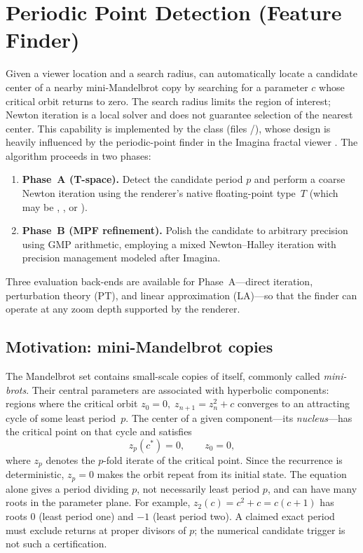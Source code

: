 \section{Periodic Point Detection (Feature Finder)}
\label{sec:feature-finder}

Given a viewer location and a search radius, \FractalShark{} can automatically
locate a candidate center of a nearby mini-Mandelbrot copy by searching for a
parameter $c$ whose critical orbit returns to zero.  The search radius limits
the region of interest; Newton iteration is a local solver and does not
guarantee selection of the nearest center.  This capability is
implemented by the  class (files
/), whose design is heavily
influenced by the periodic-point finder in the Imagina fractal viewer \cite{Imagina}.  The
algorithm proceeds in two phases:
\begin{enumerate}
\item \textbf{Phase~A (T-space).}
  Detect the candidate period $p$ and perform a coarse Newton iteration using
  the renderer's native floating-point type~$T$ (which may be ,
  , or ).
\item \textbf{Phase~B (MPF refinement).}
  Polish the candidate to arbitrary precision using GMP 
  arithmetic, employing a mixed Newton--Halley iteration with precision
  management modeled after Imagina.
\end{enumerate}
Three evaluation back-ends are available for Phase~A---direct iteration,
perturbation theory (PT), and linear approximation (LA)---so that the finder
can operate at any zoom depth supported by the renderer.

\subsection{Motivation: mini-Mandelbrot copies}
\label{subsec:ff-motivation}

The Mandelbrot set contains small-scale copies of itself, commonly called
\emph{mini-brots}.  Their central parameters are associated with hyperbolic
components: regions where the critical orbit
$z_0=0,\;z_{n+1}=z_n^2+c$ converges to an attracting cycle of some least
period~$p$.  The center of a given component---its \emph{nucleus}---has the
critical point on that cycle and satisfies
\begin{equation}\label{eq:ff-nucleus}
z_p(c^*) = 0,\qquad z_0 = 0,
\end{equation}
where $z_p$ denotes the $p$-fold iterate of the critical point.  Since the
recurrence is deterministic, $z_p=0$ makes the orbit repeat from its initial
state.  The equation alone gives a period dividing $p$, not necessarily least
period $p$, and can have many roots in the parameter plane.  For example,
$z_2(c)=c^2+c=c(c+1)$ has roots $0$ (least period one) and $-1$ (least
period two).  A claimed exact period must exclude returns at proper divisors
of $p$; the numerical candidate trigger is not such a certification.

